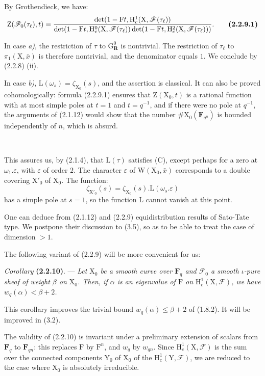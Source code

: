 \documentclass[11pt,leqno]{article}
\newcommand{\Page}[1]{\ifvmode\noindent\else\unskip\ \fi{\footnotesize\textcolor{gray}{[p.\,#1]}}\ \ignorespaces}
\begin{document}
By Grothendieck, we have:
\[
\mathrm Z(\mathscr F_0(\tau_\ell),t)
=
\frac{
 \det(1-\mathrm F t,\mathrm H_c^1(\mathrm X,\mathscr F(\tau_\ell))
}{
 \det(1-\mathrm F t,\mathrm H_c^0(\mathrm X,\mathscr F(\tau_\ell))
 \det(1-\mathrm F t,\mathrm H_c^2(\mathrm X,\mathscr F(\tau_\ell)))
}.
\tag*{\textbf{(2.2.9.1)}}
\]

In case \textit{a)}, the restriction of \(\tau\) to \(\mathrm G_{\mathbf R}^0\) is nontrivial. The restriction of \(\tau_\ell\) to \(\pi_1(\mathrm X,\bar{x})\) is therefore nontrivial, and the denominator equals \(1\). We conclude by (2.2.8) (ii).

In case \textit{b)}, \(\mathrm L(\omega_s)=\zeta_{\mathrm X_0}(s)\), and the assertion is classical. It can also be proved cohomologically: formula (2.2.9.1) ensures that \(\mathrm Z(\mathrm X_0,t)\) is a rational function with at most simple poles at \(t=1\) and \(t=q^{-1}\), and if there were no pole at \(q^{-1}\), the arguments of (2.1.12) would show that the number \(\#\mathrm X_0(\mathbf F_{q^n})\) is bounded independently of \(n\), which is absurd.

\Page{196}

This assures us, by (2.1.4), that \(\mathrm L(\tau)\) satisfies (C), except perhaps for a zero at \(\omega_1.\varepsilon\), with \(\varepsilon\) of order \(2\). The character \(\varepsilon\) of \(\mathrm W(\mathrm X_0,\bar{x})\) corresponds to a double covering \(\mathrm X'_0\) of \(\mathrm X_0\). The function:
\[
\zeta_{\mathrm X'_0}(s)=\zeta_{\mathrm X_0}(s).\mathrm L(\omega_s.\varepsilon)
\]
has a simple pole at \(s=1\), so the function \(\mathrm L\) cannot vanish at this point.

One can deduce from (2.1.12) and (2.2.9) equidistribution results of Sato-Tate type. We postpone their discussion to (3.5), so as to be able to treat the case of dimension \(>1\).

The following variant of (2.2.9) will be more convenient for us:

\textit{Corollary} \textbf{(2.2.10)}. — \textit{Let \(\mathrm X_0\) be a smooth curve over \(\mathbf F_q\) and \(\mathscr F_0\) a smooth \(\iota\)-pure sheaf of weight \(\beta\) on \(\mathrm X_0\). Then, if \(\alpha\) is an eigenvalue of \(\mathrm F\) on \(\mathrm H_c^1(\mathrm X,\mathscr F)\), we have \(w_q(\alpha)<\beta+2\).}

This corollary improves the trivial bound \(w_q(\alpha)\leq\beta+2\) of (1.8.2). It will be improved in (3.2).

The validity of (2.2.10) is invariant under a preliminary extension of scalars from \(\mathbf F_q\) to \(\mathbf F_{qn}\): this replaces \(\mathrm F\) by \(\mathrm F^n\), and \(w_q\) by \(w_{qn}\). Since \(\mathrm H_c^1(\mathrm X,\mathscr F)\) is the sum over the connected components \(\mathrm Y_0\) of \(\mathrm X_0\) of the \(\mathrm H_c^1(\mathrm Y,\mathscr F)\), we are reduced to the case where \(\mathrm X_0\) is absolutely irreducible.
\end{document}
